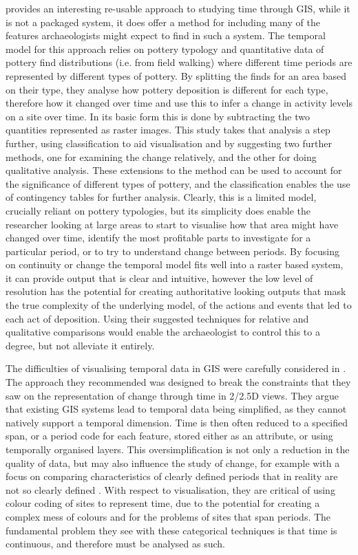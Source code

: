 \citet{Lock:1999fk} provides an interesting re-usable approach to studying time through GIS, while it  is not a packaged system, it does offer a method for including many of the features archaeologists might expect to find in such a system. The temporal model for this approach relies on pottery typology and quantitative data of pottery find distributions (i.e. from field walking) where different time periods are represented by different types of pottery. By splitting the finds for an area based on their type, they analyse how pottery deposition is different for each type, therefore how it changed over time and use this to infer a change in activity levels on a site over time. In its basic form this is done by subtracting the two quantities represented as raster images. This study takes that analysis a step further, using classification to aid visualisation and by suggesting two further methods, one for examining the change relatively, and the other for doing qualitative analysis. These extensions to the method can be used to account for the significance of different types of pottery, and the classification enables the use of contingency tables for further analysis. Clearly, this is a limited model, crucially reliant on pottery typologies, but its simplicity does enable the researcher looking at large areas to start to visualise how that area might have changed over time, identify the most profitable parts to investigate for a particular period, or to try to understand change between periods. By focusing on continuity or change the temporal model fits well into a raster based system, it can provide output that is clear and intuitive, however the low level of resolution has the potential for creating authoritative looking outputs that mask the true complexity of the underlying model, of the actions and events that led to each act of deposition. Using their suggested techniques for relative and qualitative comparisons would enable the archaeologist to control this to a degree, but not alleviate it entirely. 

The difficulties of visualising temporal data in GIS were carefully considered in \citet{lock2002analysing}. The approach they recommended was designed to break the constraints that they saw on the representation of change through time in 2/2.5D views. They argue that existing GIS systems lead to temporal data being simplified, as they cannot natively support a temporal dimension. Time is then often reduced to a specified span, or a period code for each feature, stored either as an attribute, or using temporally organised layers. This oversimplification is not only a reduction in the quality of data, but may also influence the study of change, for example with a focus on comparing characteristics of clearly defined periods that in reality are not so clearly defined \citep[4]{lock2002analysing}. With respect to visualisation, they are critical of using colour coding of sites to represent time, due to the potential for creating a complex mess of colours and for the problems of sites that span periods. The fundamental problem they see with these categorical techniques is that time is continuous, and therefore must be analysed as such.

